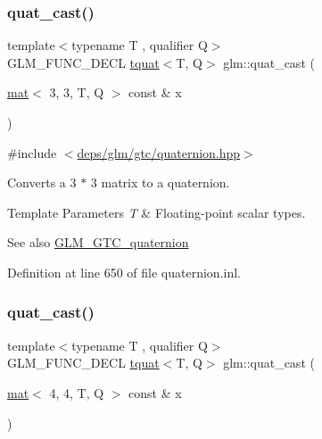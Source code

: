 \mbox{\label{group__gtc__quaternion_ga03e023aec9acd561a28594bbc8a3abf6}} 
\subsubsection{\texorpdfstring{quat\+\_\+cast()}{quat\_cast()}\hspace{0.1cm}{\footnotesize\ttfamily [1/2]}}
{\footnotesize\ttfamily template$<$typename T , qualifier Q$>$ \\
G\+L\+M\+\_\+\+F\+U\+N\+C\+\_\+\+D\+E\+CL \hyperlink{structglm_1_1tquat}{tquat}$<$T, Q$>$ glm\+::quat\+\_\+cast (\begin{DoxyParamCaption}\item[{\hyperlink{structglm_1_1mat}{mat}$<$ 3, 3, T, Q $>$ const \&}]{x }\end{DoxyParamCaption})}



{\ttfamily \#include $<$\hyperlink{gtc_2quaternion_8hpp}{deps/glm/gtc/quaternion.\+hpp}$>$}

Converts a 3 $\ast$ 3 matrix to a quaternion.


\begin{DoxyTemplParams}{Template Parameters}
{\em T} & Floating-\/point scalar types.\\
\hline
\end{DoxyTemplParams}
\begin{DoxySeeAlso}{See also}
\hyperlink{group__gtc__quaternion}{G\+L\+M\+\_\+\+G\+T\+C\+\_\+quaternion} 
\end{DoxySeeAlso}


Definition at line 650 of file quaternion.\+inl.

\mbox{\label{group__gtc__quaternion_ga50bb9aecf42fdab04e16039ab6a81c60}} 
\subsubsection{\texorpdfstring{quat\+\_\+cast()}{quat\_cast()}\hspace{0.1cm}{\footnotesize\ttfamily [2/2]}}
{\footnotesize\ttfamily template$<$typename T , qualifier Q$>$ \\
G\+L\+M\+\_\+\+F\+U\+N\+C\+\_\+\+D\+E\+CL \hyperlink{structglm_1_1tquat}{tquat}$<$T, Q$>$ glm\+::quat\+\_\+cast (\begin{DoxyParamCaption}\item[{\hyperlink{structglm_1_1mat}{mat}$<$ 4, 4, T, Q $>$ const \&}]{x }\end{DoxyParamCaption})}




